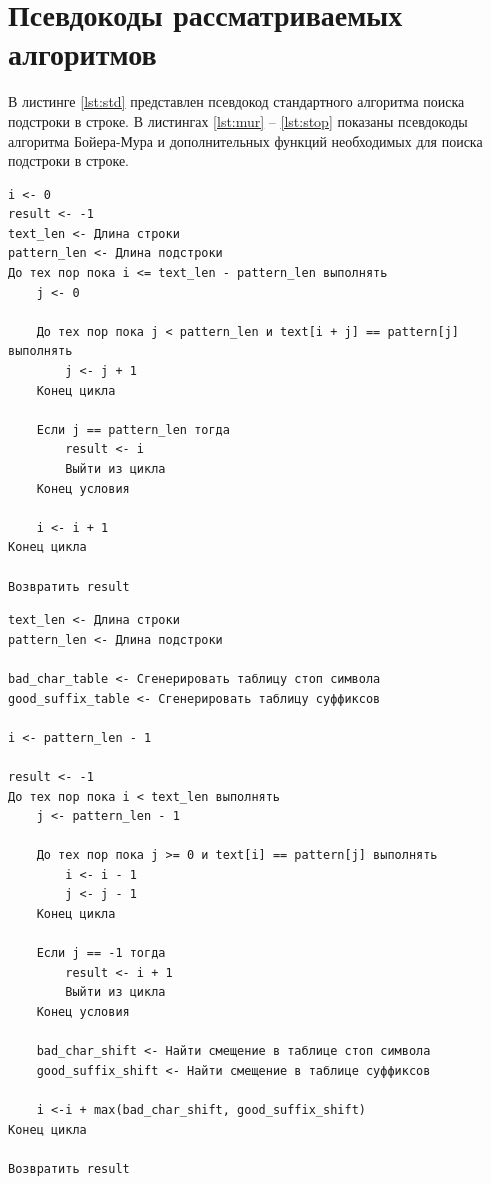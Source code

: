 \clearpage
\section{Псевдокоды рассматриваемых алгоритмов}
В листинге \ref{lst:std} представлен псевдокод стандартного алгоритма поиска подстроки в строке. 
В листингах \ref{lst:mur} -- \ref{lst:stop} показаны
псевдокоды алгоритма Бойера-Мура и дополнительных функций необходимых для поиска подстроки в строке.

\begin{lstlisting}[label=lst:std, caption = Псевдокод стандартного алгоритма поиска подстроки в строке]
i <- 0
result <- -1
text_len <- Длина строки
pattern_len <- Длина подстроки
До тех пор пока i <= text_len - pattern_len выполнять
    j <- 0

    До тех пор пока j < pattern_len и text[i + j] == pattern[j] выполнять
        j <- j + 1
    Конец цикла

    Если j == pattern_len тогда
        result <- i
        Выйти из цикла
    Конец условия

    i <- i + 1
Конец цикла

Возвратить result
\end{lstlisting}


\begin{lstlisting}[label=lst:mur, caption = Псевдокод функции поиска подстроки в строке в алгоритме Бойера-Мура]
text_len <- Длина строки
pattern_len <- Длина подстроки

bad_char_table <- Сгенерировать таблицу стоп символа
good_suffix_table <- Сгенерировать таблицу суффиксов

i <- pattern_len - 1

result <- -1
До тех пор пока i < text_len выполнять
    j <- pattern_len - 1

    До тех пор пока j >= 0 и text[i] == pattern[j] выполнять
        i <- i - 1
        j <- j - 1
    Конец цикла

    Если j == -1 тогда
        result <- i + 1
        Выйти из цикла
    Конец условия

    bad_char_shift <- Найти смещение в таблице стоп символа
    good_suffix_shift <- Найти смещение в таблице суффиксов

    i <-i + max(bad_char_shift, good_suffix_shift)
Конец цикла

Возвратить result
\end{lstlisting}

